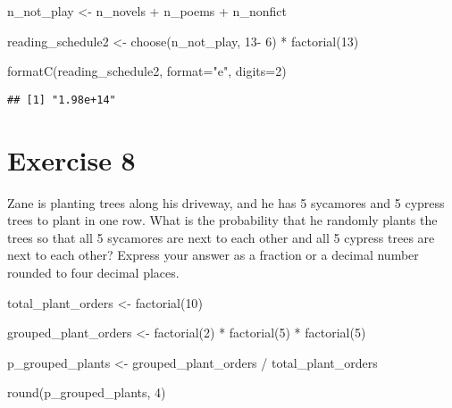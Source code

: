 \documentclass[
]{article}
\newenvironment{Shaded}{\begin{snugshade}}{\end{snugshade}}
\newcommand{\AttributeTok}[1]{\textcolor[rgb]{0.77,0.63,0.00}{#1}}
\newcommand{\DecValTok}[1]{\textcolor[rgb]{0.00,0.00,0.81}{#1}}
\newcommand{\FunctionTok}[1]{\textcolor[rgb]{0.00,0.00,0.00}{#1}}
\newcommand{\NormalTok}[1]{#1}
\newcommand{\OtherTok}[1]{\textcolor[rgb]{0.56,0.35,0.01}{#1}}
\newcommand{\SpecialCharTok}[1]{\textcolor[rgb]{0.00,0.00,0.00}{#1}}
\newcommand{\StringTok}[1]{\textcolor[rgb]{0.31,0.60,0.02}{#1}}
\begin{document}
\begin{Shaded}
\begin{Highlighting}[]
\NormalTok{n\_not\_play }\OtherTok{\textless{}{-}}\NormalTok{ n\_novels }\SpecialCharTok{+}\NormalTok{ n\_poems }\SpecialCharTok{+}\NormalTok{ n\_nonfict}

\NormalTok{reading\_schedule2 }\OtherTok{\textless{}{-}} \FunctionTok{choose}\NormalTok{(n\_not\_play, }\DecValTok{13}\SpecialCharTok{{-}} \DecValTok{6}\NormalTok{) }\SpecialCharTok{*} \FunctionTok{factorial}\NormalTok{(}\DecValTok{13}\NormalTok{)}

\FunctionTok{formatC}\NormalTok{(reading\_schedule2, }\AttributeTok{format=}\StringTok{"e"}\NormalTok{, }\AttributeTok{digits=}\DecValTok{2}\NormalTok{)}
\end{Highlighting}
\end{Shaded}

\begin{verbatim}
## [1] "1.98e+14"
\end{verbatim}

\hypertarget{exercise-8}{%
\section{Exercise 8}\label{exercise-8}}

Zane is planting trees along his driveway, and he has 5 sycamores and 5
cypress trees to plant in one row. What is the probability that he
randomly plants the trees so that all 5 sycamores are next to each other
and all 5 cypress trees are next to each other? Express your answer as a
fraction or a decimal number rounded to four decimal places.

\begin{Shaded}
\begin{Highlighting}[]
\NormalTok{total\_plant\_orders }\OtherTok{\textless{}{-}} \FunctionTok{factorial}\NormalTok{(}\DecValTok{10}\NormalTok{)}

\NormalTok{grouped\_plant\_orders }\OtherTok{\textless{}{-}} \FunctionTok{factorial}\NormalTok{(}\DecValTok{2}\NormalTok{) }\SpecialCharTok{*} \FunctionTok{factorial}\NormalTok{(}\DecValTok{5}\NormalTok{) }\SpecialCharTok{*} \FunctionTok{factorial}\NormalTok{(}\DecValTok{5}\NormalTok{)}

\NormalTok{p\_grouped\_plants }\OtherTok{\textless{}{-}}\NormalTok{ grouped\_plant\_orders }\SpecialCharTok{/}\NormalTok{ total\_plant\_orders}

\FunctionTok{round}\NormalTok{(p\_grouped\_plants, }\DecValTok{4}\NormalTok{)}
\end{Highlighting}
\end{Shaded}
\end{document}
